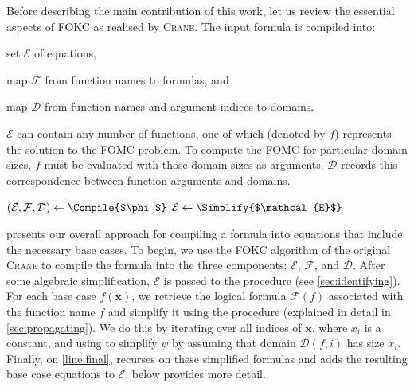 \documentclass[letterpaper]{article} %
\theoremstyle{remark}
\theoremstyle{definition}
\begin{document}
Before describing the main contribution of this work, let us review the
essential aspects of FOKC as realised by \textsc{Crane}. The input formula is
compiled into:
\begin{enumerate*}[label=(\roman*)]
  \item set $\mathcal{E}$ of equations,
  \item map $\mathcal{F}$ from function names to formulas, and
  \item map $\mathcal{D}$ from function names and argument indices to domains.
\end{enumerate*}
$\mathcal{E}$ can contain any number of functions, one of which (denoted by $f$)
represents the solution to the FOMC problem. To compute the FOMC for particular
domain sizes, $f$ must be evaluated with those domain sizes as arguments.
$\mathcal{D}$ records this correspondence between function arguments and
domains.

\begin{algorithm}[t]
  \caption{\protect\CompileWithBaseCases{$\phi$}}\label{alg:compilewithbasecases}
  $(\mathcal{E}, \mathcal{F}, \mathcal{D}) \gets \Compile{$\phi$}$\;\label{line:first}
  $\mathcal{E} \gets \Simplify{$\mathcal{E}$}$\;\label{line:second}
\end{algorithm}

 presents our overall approach for compiling a
formula into equations that include the necessary base cases. To begin, we use
the FOKC algorithm of the original \textsc{Crane} to compile the formula into
the three components: $\mathcal{E}$, $\mathcal{F}$, and $\mathcal{D}$. After
some algebraic simplification, $\mathcal{E}$ is passed to the \FindBaseCases
procedure (see \cref{sec:identifying}). For each base case $f(\mathbf{x})$, we
retrieve the logical formula $\mathcal{F}(f)$ associated with the function name
$f$ and simplify it using the \Propagate procedure (explained in detail in
\cref{sec:propagating}). We do this by iterating over all indices of
$\mathbf{x}$, where $x_{i}$ is a constant, and using \Propagate to simplify
$\psi$ by assuming that domain $\mathcal{D}(f, i)$ has size $x_{i}$. Finally, on
\cref{line:final}, \CompileWithBaseCases recurses on these simplified formulas
and adds the resulting base case equations to $\mathcal{E}$.
 below provides more detail.
\end{document}
